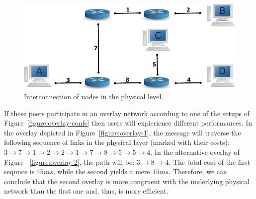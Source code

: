 \documentclass[acmcsur,acmnow]{acmtrans2m}
\begin{document}
\begin{figure}
\centering
  \includegraphics[scale=0.8]{img/phys.pdf}
\caption{Interconnection of nodes in the physical level.}
\label{figure:phys}
\end{figure}

If these peers participate in an overlay network according to one of the setups of Figure~\ref{figure:overlay-confs} then users will expierience different performances. In the overlay depicted in Figure~\ref{figure:overlay-1}, the message will traverse the following sequence of links in the physical layer (marked with their costs): $3 \rightarrow 7 \rightarrow 1 \rightarrow 2 \rightarrow 2 \rightarrow 1 \rightarrow 7 \rightarrow 8 \rightarrow 5 \rightarrow 5 \rightarrow 4$. In the alternative overlay of Figure ~\ref{figure:overlay-2}, the path will be: $3 \rightarrow 8 \rightarrow 4$. The total cost of the first sequnce is $45 ms$, while the second yields a mere $15 ms$. Therefore, we can conclude that the second overlay is more congruent with the underlying physical network than the first one and, thus, is more efficient.
\end{document}
